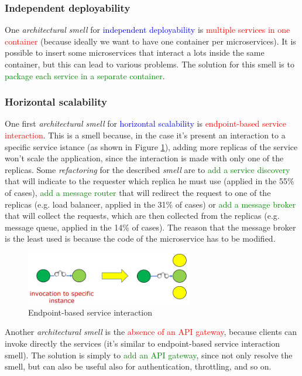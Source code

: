 \subsubsection{Independent deployability}
One \textit{architectural smell} for \textcolor{blue}{independent deployability} is \textcolor{red}{multiple services in one container} (because ideally we want to have one container per microservices). It is possible to insert some microservices that interact a lots inside the same container, but this can lead to various problems. The solution for this smell is to \textcolor{green}{package each service in a separate container}.

\subsubsection{Horizontal scalability}
One first \textit{architectural smell} for \textcolor{blue}{horizontal scalability} is \textcolor{red}{endpoint-based service interaction}. This is a smell because, in the case it's present an interaction to a specific service istance (as shown in Figure \ref{fig:end-point-img1}), adding more replicas of the service won't scale the application, since the interaction is made with only one of the replicas. Some \textit{refactoring} for the described \textit{smell} are to \textcolor{green}{add a service discovery} that will indicate to the requester which replica he must use (applied in the 55\% of cases), \textcolor{green}{add a message router} that will redirect the request to one of the replicas (e.g. load balancer, applied in the 31\% of cases) or \textcolor{green}{add a message broker} that will collect the requests, which are then collected from the replicas (e.g. message queue, applied in the 14\% of cases). The reason that the message broker is the least used is because the code of the microservice has to be modified.
\begin{figure} [H]    \centering
    \includegraphics[width=0.65\textwidth]{images/end-point-img1.PNG}    \caption{Endpoint-based service interaction}
    \label{fig:end-point-img1}\end{figure} 
Another \textit{architectural smell} is the \textcolor{red}{absence of an API gateway}, because clients can invoke directly the services (it's similar to endpoint-based service interaction smell). The solution is simply to \textcolor{green}{add an API gateway}, since not only resolve the smell, but can also be useful also for authentication, throttling, and so on.


